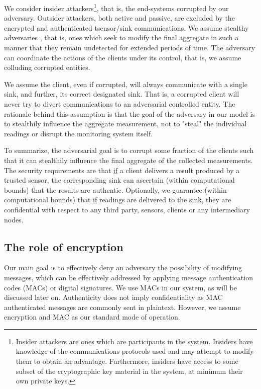 We consider insider attackers\footnote{Insider attackers are ones which are participants in the system. Insiders have knowledge of the communications protocols used and may attempt to modify them to obtain an advantage. Furthermore, insiders have access to some subset of the cryptographic key material in the system, at minimum their own private keys.}, that is, the end-systems corrupted by our adversary. Outsider attackers, both active and passive, are excluded by the encrypted and authenticated tsensor/sink communications. We assume stealthy adversaries , that is, ones which seek to modify the final aggregate in such a manner that they remain undetected for extended periods of time. The adversary can coordinate the actions of the clients under its control, that is, we assume colluding corrupted entities.

We assume the client, even if corrupted, will always communicate with a single sink, and further, its correct designated sink. That is, a corrupted client will never try to divert communications to an adversarial controlled entity. The rationale behind this assumption is that the goal of the adversary in our model is to stealthily influence the aggregate measurement, not to "steal" the individual readings or disrupt the monitoring system itself.

To summarize, the adversarial goal is to corrupt some fraction of the clients such that it can stealthily influence the final aggregate of the collected measurements. The security requirements are that \underline{if} a client delivers a result produced by a trusted sensor, the corresponding sink can ascertain (within computational bounds) that the results are authentic. Optionally, we guarantee (within computational bounds) that \underline{if} readings are delivered to the sink, they are confidential with respect to any third party, sensors, clients or any intermediary nodes.

%

\subsection*{The role of encryption}

Our main goal is to effectively deny an adversary the possibility of modifying messages, which can be effectively addressed by applying message authentication codes (MACs) or digital signatures. We use MACs in our system, as will be discussed later on. Authenticity does not imply confidentiality as MAC authenticated messages are commonly sent in plaintext. However, we assume encryption and MAC as our standard mode of operation. 

